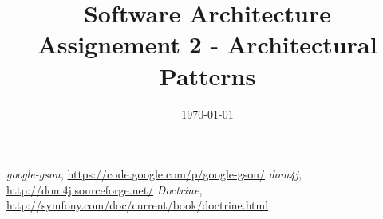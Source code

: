 \documentclass[a4paper, 11pt]{article}
\title{
	\textbf{Software Architecture}\\
    \Large{Assignement 2 - Architectural Patterns}
}
\date{\today}
\begin{document}
\maketitle
\newpage

\tableofcontents
\newpage






\begin{thebibliography}{5}
 \emph{google-gson}, \href{https://code.google.com/p/google-gson/}{https://code.google.com/p/google-gson/}
 \emph{dom4j}, \href{http://dom4j.sourceforge.net/}{http://dom4j.sourceforge.net/}
 \emph{Doctrine}, \href{http://symfony.com/doc/current/book/doctrine.html}{http://symfony.com/doc/current/book/doctrine.html}
\end{thebibliography}
\end{document}
